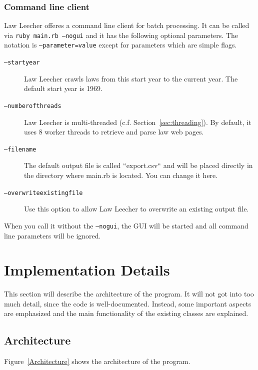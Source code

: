 \documentclass{scrartcl}
\begin{document}
\subsubsection{Command line client}
Law Leecher offeres a command line client for batch processing. It can be called via \texttt{ruby main.rb ---nogui} and it has the following optional parameters. The notation is \texttt{---parameter=value} except for parameters which are simple flags.
\begin{description}
\item[\texttt{---startyear}] Law Leecher crawls laws from this start year to the current year. The default start year is 1969.
\item[\texttt{---numberofthreads}] Law Leecher is multi-threaded (c.f. Section~\ref{sec:threading}). By default, it uses 8 worker threads to retrieve and parse law web pages.
\item[\texttt{---filename}] The default output file is called ``export.csv`` and will be placed directly in the directory where main.rb is located. You can change it here.
\item[\texttt{---overwriteexistingfile}] Use this option to allow Law Leecher to overwrite an existing output file.
\end{description}

When you call it without the \texttt{---nogui}, the GUI will be started and all command line parameters will be ignored.



\section{Implementation Details}
This section will describe the architecture of the program. It will not got into too much detail, since the code is well-documented. Instead, some important aspects are emphasized and the main functionality of the existing classes are explained.

\subsection{Architecture}
Figure~\ref{Architecture} shows the architecture of the program.
\end{document}
